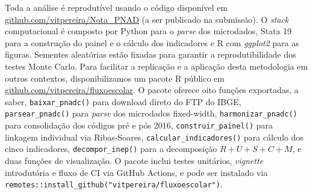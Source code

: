 Toda a análise é reprodutível usando o código disponível em
\href{https://github.com/vitpereira/Nota_PNAD}{github.com/vitpereira/Nota\_PNAD}
(a ser publicado na submissão). O \emph{stack} computacional é
composto por Python para o \emph{parse} dos microdados, Stata 19
para a construção do painel e o cálculo dos indicadores e R com
\emph{ggplot2} para as figuras. Sementes aleatórias estão fixadas
para garantir a reprodutibilidade dos testes Monte Carlo. Para
facilitar a replicação e a aplicação desta metodologia em outros
contextos, disponibilizamos um pacote R público em
\href{https://github.com/vitpereira/fluxoescolar}{github.com/vitpereira/fluxoescolar}.
O pacote oferece oito funções exportadas, a saber,
\texttt{baixar\_pnadc()} para download direto do FTP do IBGE,
\texttt{parsear\_pnadc()} para \emph{parse} dos microdados
fixed-width, \texttt{harmonizar\_pnadc()} para consolidação dos
códigos pré e pós 2016, \texttt{construir\_painel()} para linkagem
individual via Ribas-Soares, \texttt{calcular\_indicadores()} para
cálculo dos cinco indicadores, \texttt{decompor\_inep()} para a
decomposição $R+U+S+C+M$, e duas funções de visualização. O pacote
inclui testes unitários, \emph{vignette} introdutória e fluxo de
CI via GitHub Actions, e pode ser instalado via\\
\texttt{remotes::install\_github("vitpereira/fluxoescolar")}.
